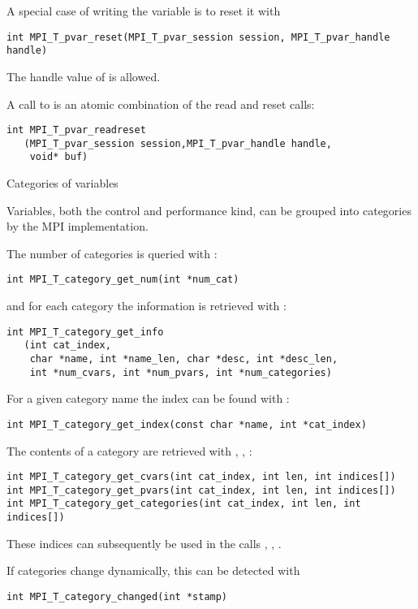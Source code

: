 \begin{mpifour}
A special case of writing the variable is to reset it with
\begin{lstlisting}
int MPI_T_pvar_reset(MPI_T_pvar_session session, MPI_T_pvar_handle handle)  
\end{lstlisting}
The handle value of  is allowed.

A call to 
is an atomic combination of the read and reset calls:
\begin{lstlisting}
int MPI_T_pvar_readreset
   (MPI_T_pvar_session session,MPI_T_pvar_handle handle, 
    void* buf)
\end{lstlisting}


 {Categories of variables}

Variables, both the control and performance kind,
can be grouped into categories by the MPI implementation.

The number of categories is queried with
:
\begin{lstlisting}
int MPI_T_category_get_num(int *num_cat)
\end{lstlisting}
and for each category the information is retrieved with
:
\begin{lstlisting}
int MPI_T_category_get_info
   (int cat_index,
    char *name, int *name_len, char *desc, int *desc_len, 
    int *num_cvars, int *num_pvars, int *num_categories)
\end{lstlisting}
For a given category name the index can be found with
:
\begin{lstlisting}
int MPI_T_category_get_index(const char *name, int *cat_index)
\end{lstlisting}

The contents of a category are retrieved with
,
,
:
\begin{lstlisting}
int MPI_T_category_get_cvars(int cat_index, int len, int indices[])
int MPI_T_category_get_pvars(int cat_index, int len, int indices[])
int MPI_T_category_get_categories(int cat_index, int len, int indices[])
\end{lstlisting}

\begin{raggedlist}
  These indices can subsequently be used in the calls
  ,
  ,
  .
\end{raggedlist}

If categories change dynamically, this can be detected with
\begin{lstlisting}
int MPI_T_category_changed(int *stamp)
\end{lstlisting}

\end{mpifour}
